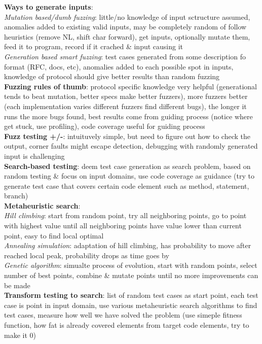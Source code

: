 \documentclass[a4paper]{article}
\begin{document}
\begin{multicols}{3}
        \textbf{Ways to generate inputs}:\\
        \textit{Mutation based/dumb fuzzing}: little/no knowledge of input sctructure assumed, anomalies added to existing valid inputs, may be completely random of follow heuristics (remove NL, shift char forward), get inputs, optionally mutate them, feed it to program, record if it crached \& input causing it\\
        \textit{Generation based smart fuzzing}: test cases generated from some description fo format (RFC, docs, etc), anomalies added to each possible spot in inputs, knowledge of protocol should give better results than random fuzzing\\
        \textbf{Fuzzing rules of thumb}: protocol specific knowledge very helpful (generational tends to beat mutation, better specs make better fuzzers), more fuzzers better (each implementation varies different fuzzers find different bugs), the longer it runs the more bugs found, best results come from guiding process (notice where get stuck, use profiling), code coverage useful for guiding process\\
        \textbf{Fuzz testing +/-}: intuituvely simple, but need to figure out how to check the output, corner faults might escape detection, debugging with randomly generated input is challenging\\
        \textbf{Search-based testing}: deem test case generation as search problem, based on random testing \& focus on input domains, use code coverage as guidance (try to generate test case that covers certain code element such as method, statement, branch)\\
        \textbf{Metaheuristic search}:\\
        \textit{Hill climbing}: start from random point, try all neighboring points, go to point with highest value until all neighboring points have value lower than current point, easy to find local optimal\\
        \textit{\textit{Annealing simulation}}: adaptation of hill climbing, has probability to move after reached local peak, probability drops as time goes by\\
        \textit{Genetic algorithm}: simualte process of evolution, start with random points, select number of best points, combine \& mutate points until no more improvements can be made\\
        \textbf{Transform testing to search}: list of random test cases as start point, each test case is point in input domain, use various metaheuristic search algorithms to find test cases, measure how well we have solved the problem (use simeple fitness function, how fat is already covered elements from target code elements, try to make it 0)\\

\end{multicols}
\end{document}
